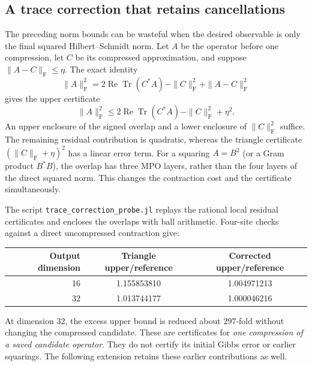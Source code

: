 \documentclass[11pt]{article}
\newcommand{\Tr}{\operatorname{Tr}}
\begin{document}
\subsection{A trace correction that retains cancellations}
The preceding norm bounds can be wasteful when the desired observable is
only the final squared Hilbert--Schmidt norm. Let $A$ be the operator before
one compression, let $C$ be its compressed approximation, and suppose
$\|A-C\|_{\mathrm F}\le\eta$. The exact identity
\[
 \|A\|_{\mathrm F}^2
 =2\operatorname{Re}\Tr(C^*A)-\|C\|_{\mathrm F}^2
   +\|A-C\|_{\mathrm F}^2
\]
gives the upper certificate
\[
 \|A\|_{\mathrm F}^2
 \le 2\operatorname{Re}\Tr(C^*A)-\|C\|_{\mathrm F}^2+\eta^2.
\]
An upper enclosure of the signed overlap and a lower enclosure of
$\|C\|_{\mathrm F}^2$ suffice. The remaining residual contribution is
quadratic, whereas the triangle certificate
$(\|C\|_{\mathrm F}+\eta)^2$ has a linear error term.
For a squaring $A=B^2$ (or a Gram product $B^*B$), the overlap has three
MPO layers, rather than the four layers of the direct squared norm.
This changes the contraction cost and the certificate simultaneously.

The script \texttt{trace\_correction\_probe.jl} replays the rational local
residual certificates and encloses the overlaps with ball arithmetic.
Four-site checks against a direct uncompressed contraction give:
\begin{center}
\begin{tabular}{rcc}
Output dimension & Triangle upper/reference & Corrected upper/reference\\
\hline
16 & 1.155853810 & 1.004971213\\
32 & 1.013744177 & 1.000046216
\end{tabular}
\end{center}
At dimension $32$, the excess upper bound is reduced about $297$-fold
without changing the compressed candidate. These are certificates for
\emph{one compression of a saved candidate operator}. They do not
certify its initial Gibbs error or earlier squarings. The following
extension retains these earlier contributions as well.
\end{document}
